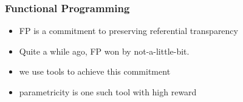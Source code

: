 \begin{frame}
\frametitle{Functional Programming}
\begin{itemize}
  \item<1-> FP is a commitment to preserving referential transparency
  \item<2-> Quite a while ago, FP won by not-a-little-bit.
  \item<3-> we use tools to achieve this commitment
  \item<4-> parametricity is one such tool with high reward
\end{itemize}
\end{frame}
